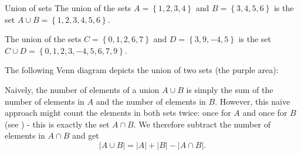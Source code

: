 \begin{example}{Union of sets}{}
	The union of the sets $A=\left\{ 1,2,3,4 \right\}$ and $B=\left\{ 3,4,5,6 \right\}$ is the set $A\cup B=\left\{ 1,2,3,4,5,6 \right\}$.

	The union of the sets $C=\left\{ 0,1,2,6,7 \right\}$ and $D=\left\{ 3,9,-4,5 \right\}$ is the set $C\cup D=\left\{ 0,1,2,3,-4,5,6,7,9 \right\}$.
\end{example}

The following Venn diagram depicts the union of two sets (the purple area):
\begin{figure}[H]
	\centering
\end{figure}

Naively, the number of elements of a union $A\cup B$ is simply the sum of the number of elements in $A$ and the number of elements in $B$. However, this naive approach might count the elements in both sets twice: once for $A$ and once for $B$ (see ) - this is exactly the set $A\cap B$. We therefore subtract the number of elements in $A\cap B$ and get
\begin{equation}
	|A\cup B| = |A|+|B|-|A\cap B|.
	\label{eq:number_of_elements_in_union}
\end{equation}

